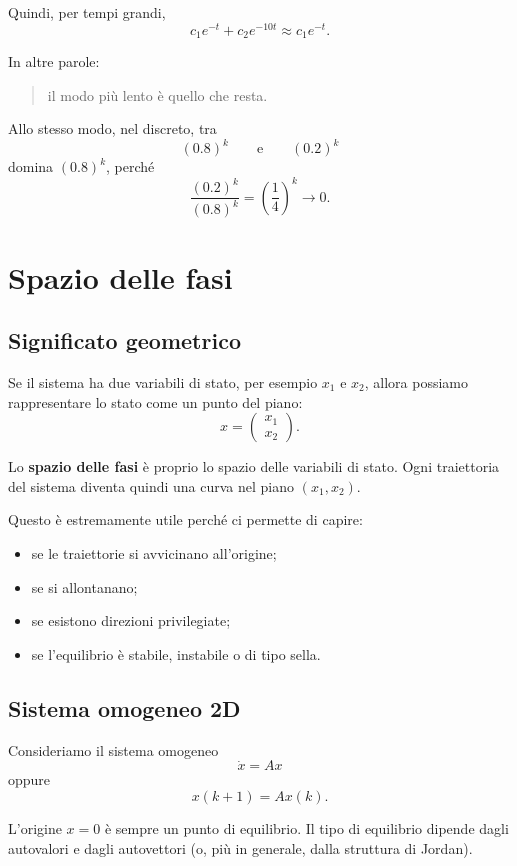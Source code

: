Quindi, per tempi grandi,
\[
c_1e^{-t}+c_2e^{-10t}\approx c_1e^{-t}.
\]

In altre parole:
\begin{quote}
il modo più lento è quello che resta.
\end{quote}

Allo stesso modo, nel discreto, tra
\[
(0.8)^k
\qquad \text{e} \qquad
(0.2)^k
\]
domina $(0.8)^k$, perché
\[
\frac{(0.2)^k}{(0.8)^k}=\left(\frac14\right)^k\to 0.
\]

\section{Spazio delle fasi}

\subsection{Significato geometrico}

Se il sistema ha due variabili di stato, per esempio $x_1$ e $x_2$, allora possiamo rappresentare lo stato come un punto del piano:
\[
x=
\begin{pmatrix}
x_1\\
x_2
\end{pmatrix}.
\]

Lo \textbf{spazio delle fasi} è proprio lo spazio delle variabili di stato.  
Ogni traiettoria del sistema diventa quindi una curva nel piano $(x_1,x_2)$.

Questo è estremamente utile perché ci permette di capire:
\begin{itemize}
    \item se le traiettorie si avvicinano all'origine;
    \item se si allontanano;
    \item se esistono direzioni privilegiate;
    \item se l'equilibrio è stabile, instabile o di tipo sella.
\end{itemize}

\subsection{Sistema omogeneo 2D}

Consideriamo il sistema omogeneo
\[
\dot x = Ax
\]
oppure
\[
x(k+1)=Ax(k).
\]

L'origine $x=0$ è sempre un punto di equilibrio.  
Il tipo di equilibrio dipende dagli autovalori e dagli autovettori (o, più in generale, dalla struttura di Jordan).

